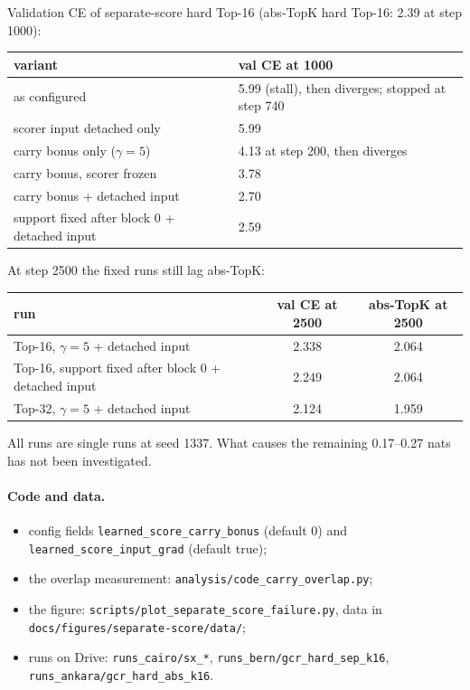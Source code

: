 \documentclass[11pt,a4paper]{article}
\newcommand{\code}[1]{\texttt{#1}}
\begin{document}
Validation CE of separate-score hard Top-16 (abs-TopK hard Top-16: 2.39 at step 1000):

\begin{center}
\begin{tabular}{ll}
\toprule
variant & val CE at 1000 \\
\midrule
as configured & 5.99 (stall), then diverges; stopped at step 740 \\
scorer input detached only & 5.99 \\
carry bonus only ($\gamma = 5$) & 4.13 at step 200, then diverges \\
carry bonus, scorer frozen & 3.78 \\
carry bonus + detached input & 2.70 \\
support fixed after block 0 + detached input & 2.59 \\
\bottomrule
\end{tabular}
\end{center}

At step 2500 the fixed runs still lag abs-TopK:

\begin{center}
\begin{tabular}{lcc}
\toprule
run & val CE at 2500 & abs-TopK at 2500 \\
\midrule
Top-16, $\gamma = 5$ + detached input & 2.338 & 2.064 \\
Top-16, support fixed after block 0 + detached input & 2.249 & 2.064 \\
Top-32, $\gamma = 5$ + detached input & 2.124 & 1.959 \\
\bottomrule
\end{tabular}
\end{center}

All runs are single runs at seed 1337. What causes the remaining 0.17--0.27 nats has not
been investigated.

\paragraph{Code and data.}
{\raggedright
\begin{itemize}[leftmargin=1.5em,itemsep=1pt]
  \item config fields \code{learned\_score\_carry\_bonus} (default 0) and
    \code{learned\_score\_input\_grad} (default true);
  \item the overlap measurement: \code{analysis/code\_carry\_overlap.py};
  \item the figure: \code{scripts/plot\_separate\_score\_failure.py}, data in
    \code{docs/figures/separate-score/data/};
  \item runs on Drive: \code{runs\_cairo/sx\_*}, \code{runs\_bern/gcr\_hard\_sep\_k16},
    \code{runs\_ankara/gcr\_hard\_abs\_k16}.
\end{itemize}
}
\end{document}
